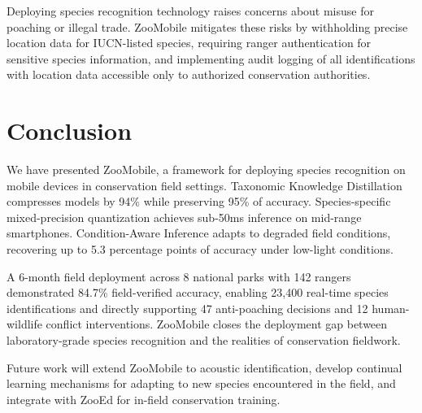 \documentclass[11pt,a4paper]{article}
\begin{document}
Deploying species recognition technology raises concerns about misuse for poaching or illegal trade.
ZooMobile mitigates these risks by withholding precise location data for IUCN-listed species, requiring ranger authentication for sensitive species information, and implementing audit logging of all identifications with location data accessible only to authorized conservation authorities.

\section{Conclusion}
\label{sec:conclusion}

We have presented ZooMobile, a framework for deploying species recognition on mobile devices in conservation field settings.
Taxonomic Knowledge Distillation compresses models by 94\% while preserving 95\% of accuracy.
Species-specific mixed-precision quantization achieves sub-50ms inference on mid-range smartphones.
Condition-Aware Inference adapts to degraded field conditions, recovering up to 5.3 percentage points of accuracy under low-light conditions.

A 6-month field deployment across 8 national parks with 142 rangers demonstrated 84.7\% field-verified accuracy, enabling 23,400 real-time species identifications and directly supporting 47 anti-poaching decisions and 12 human-wildlife conflict interventions.
ZooMobile closes the deployment gap between laboratory-grade species recognition and the realities of conservation fieldwork.

Future work will extend ZooMobile to acoustic identification, develop continual learning mechanisms for adapting to new species encountered in the field, and integrate with ZooEd for in-field conservation training.
\end{document}
